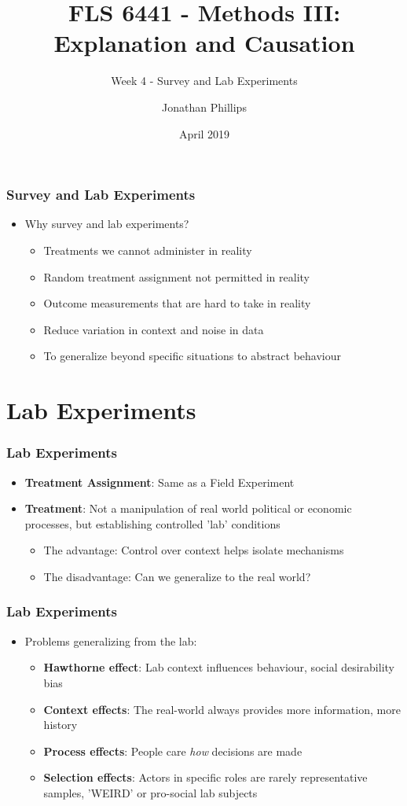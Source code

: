 \documentclass[xcolor=x11names,compress]{beamer}\usepackage[]{graphicx}\usepackage[]{color}
\title{FLS 6441 - Methods III: Explanation and Causation}
\subtitle{Week 4 - Survey and Lab Experiments}
\author{Jonathan Phillips}
\date{April 2019}
\renewcommand{\(}{\begin{columns}}
\renewcommand{\)}{\end{columns}}
\newcommand{\<}[1]{\begin{column}{#1}}
\renewcommand{\>}{\end{column}}
\begin{document}
\frame{\titlepage}

\begin{frame}
\frametitle{Survey and Lab Experiments}
\begin{itemize}
\item Why survey and lab experiments?
\pause
\begin{itemize}
\item Treatments we cannot administer in reality
\pause
\item Random treatment assignment not permitted in reality
\pause
\item Outcome measurements that are hard to take in reality
\pause
\item Reduce variation in context and noise in data
\pause
\item To generalize beyond specific situations to abstract behaviour
\end{itemize}
\end{itemize}
\end{frame}

\section{Lab Experiments}

\begin{frame}
\frametitle{Lab Experiments}
\begin{itemize}
\item \textbf{Treatment Assignment}: Same as a Field Experiment
\pause
\item \textbf{Treatment}: Not a manipulation of real world political or economic processes, but establishing controlled 'lab' conditions
\pause
\begin{itemize}
\item The advantage: Control over context helps isolate mechanisms
\pause
\item The disadvantage: Can we generalize to the real world?
\end{itemize}
\end{itemize}
\end{frame}

\begin{frame}
\frametitle{Lab Experiments}
\begin{itemize}
\item Problems generalizing from the lab:
\pause
\begin{itemize}
\item \textbf{Hawthorne effect}: Lab context influences behaviour, social desirability bias
\pause
\item \textbf{Context effects}: The real-world always provides more information, more history
\pause
\item \textbf{Process effects}: People care \textit{how} decisions are made
\item \textbf{Selection effects}: Actors in specific roles are rarely representative samples, 'WEIRD' or pro-social lab subjects
\end{itemize}
\end{itemize}
\end{frame}
\end{document}
